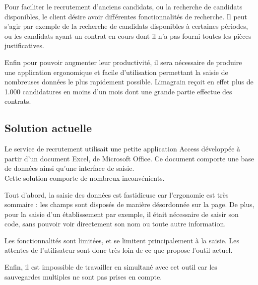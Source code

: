 Pour faciliter le recrutement d'anciens candidats, ou la recherche de candidats disponibles, le client désire avoir différentes fonctionnalités de recherche.
Il peut s'agir par exemple de la recherche de candidats disponibles à certaines périodes, ou les candidats ayant un contrat en cours dont il n'a pas fourni toutes les pièces justificatives.

Enfin pour pouvoir augmenter leur productivité, il sera nécessaire de produire une application ergonomique et facile d'utilisation permettant la saisie de nombreuses données le plus rapidement possible.
Limagrain reçoit en effet plus de 1.000 candidatures en moins d'un mois dont une grande partie effectue des contrats.


\subsection{Solution actuelle}

Le service de recrutement utilisait une petite application Access développée à partir d'un document Excel, de Microsoft Office.
Ce document comporte une base de données ainsi qu'une interface de saisie.
\\

Cette solution comporte de nombreux inconvénients.

Tout d'abord, la saisie des données est fastidieuse car l'ergonomie est très sommaire : les champs sont disposés de manière désordonnée sur la page.
De plus, pour la saisie d'un établissement par exemple, il était nécessaire de saisir son code, sans pouvoir voir directement son nom ou toute autre information.

Les fonctionnalités sont limitées, et se limitent principalement à la saisie.
Les attentes de l'utilisateur sont donc très loin de ce que propose l'outil actuel.

Enfin, il est impossible de travailler en simultané avec cet outil car les sauvegardes multiples ne sont pas prises en compte.


